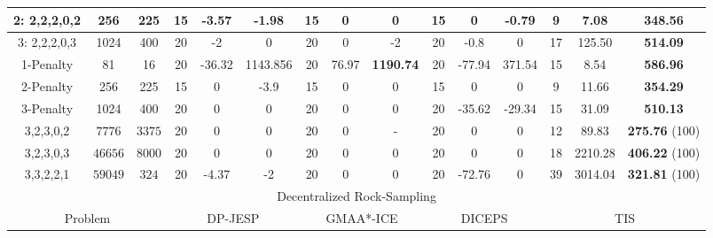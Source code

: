 \documentclass[runningheads]{llncs}
\newcommand{\drs}[0]{Decentralized Rock-Sampling}
\begin{document}
\begin{table}[t]
\begin{tabular}{|c|c|c||c|c|c||c|c|c||c|c|c||c|c|c||}
         \hline
         
         2: 2,2,2,0,2&256 & 225    & 15 & -3.57 & -1.98 & 15 & 0 & 0 & 15 & 0 & -0.79 & 9 & 7.08 & \textbf{348.56} \\
         \hline
         
         
         3: 2,2,2,0,3& 1024 & 400  & 20 & -2 & 0 & 20 & 0 & -2 & 20 & -0.8 & 0 & 17 & 125.50 & \textbf{514.09}\\
         \hline
         
         1-Penalty &81&16& 20 & -36.32 & 1143.856& 20 & 76.97 & \textbf{1190.74} & 20 & -77.94 & 371.54
         & 15 & 8.54 & {\bf 586.96} \\
         \hline 
         
         2-Penalty &256 & 225  & 15 & 0 & -3.9  & 15& 0 & 0  & 15& 0 & 0 & 9 & 11.66 & \textbf{354.29} \\
         \hline 
         

         3-Penalty & 1024 & 400   & 20 & 0 & 0 & 20& 0 &  0 & 20 & -35.62 &  -29.34  & 15 & 31.09 & \textbf{510.13}  \\
         \hline 

         3,2,3,0,2 &
         $7776$& $3375$   & 20 & 0 & 0  & 20 & 0 & - & 20 & 0  & 0 & 12 & 89.83 & {\bf 275.76} (100)\\
          
         \hline
         3,2,3,0,3 &
         $46656$ & $8000$   &20 & 0 & 0 & 20 & 0 & 0 & 20 & 0 & 0 & 18 & 2210.28 & {\bf 406.22} (100) \\
         
         \hline
         
         \hline
         3,3,2,2,1 &
         $59049$&$324$     &20 & -4.37 & -2 & 20 & 0 & 0 & 20 & -72.76 & 0 & 39 & 3014.04 & {\bf 321.81} (100) \\
                 \hline
         
         \hline

                  \hline
        
        
         \multicolumn{15}{|c|}{\drs} \\
         \hline
         \multicolumn{3}{|c||}{Problem} &\multicolumn{3}{|c||}{DP-JESP} & \multicolumn{3}{c||}{GMAA*-ICE} & \multicolumn{3}{|c||}{DICEPS} & \multicolumn{3}{c||}{TIS}\\
        

\end{tabular}
\end{table}
\end{document}
